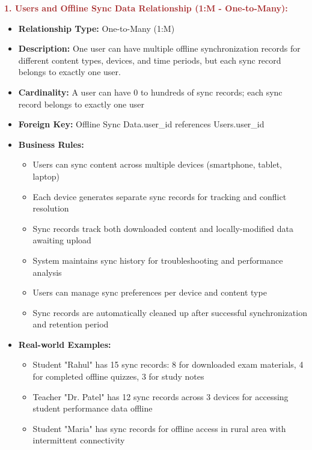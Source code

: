 \documentclass[12pt,a4paper,oneside]{book}
\begin{document}
\textbf{\textcolor{brown}{1. Users and Offline Sync Data Relationship (1:M - One-to-Many):}}
\begin{itemize}
    \item \textbf{Relationship Type:} One-to-Many (1:M)
    \item \textbf{Description:} One user can have multiple offline synchronization records for different content types, devices, and time periods, but each sync record belongs to exactly one user.
    \item \textbf{Cardinality:} A user can have 0 to hundreds of sync records; each sync record belongs to exactly one user
    \item \textbf{Foreign Key:} Offline Sync Data.user\_id references Users.user\_id
    \item \textbf{Business Rules:}
        \begin{itemize}
            \item Users can sync content across multiple devices (smartphone, tablet, laptop)
            \item Each device generates separate sync records for tracking and conflict resolution
            \item Sync records track both downloaded content and locally-modified data awaiting upload
            \item System maintains sync history for troubleshooting and performance analysis
            \item Users can manage sync preferences per device and content type
            \item Sync records are automatically cleaned up after successful synchronization and retention period
        \end{itemize}
    \item \textbf{Real-world Examples:}
        \begin{itemize}
            \item Student "Rahul" has 15 sync records: 8 for downloaded exam materials, 4 for completed offline quizzes, 3 for study notes
            \item Teacher "Dr. Patel" has 12 sync records across 3 devices for accessing student performance data offline
            \item Student "Maria" has sync records for offline access in rural area with intermittent connectivity
        \end{itemize}
\end{itemize}
\end{document}
